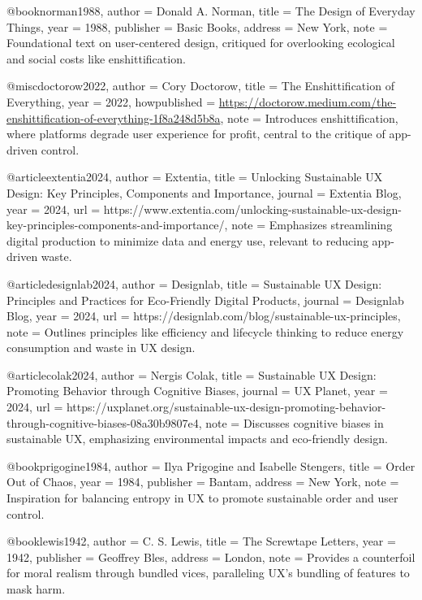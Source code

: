 @book{norman1988,
  author    = {Donald A. Norman},
  title     = {The Design of Everyday Things},
  year      = {1988},
  publisher = {Basic Books},
  address   = {New York},
  note      = {Foundational text on user-centered design, critiqued for overlooking ecological and social costs like enshittification.}
}

@misc{doctorow2022,
  author    = {Cory Doctorow},
  title     = {The Enshittification of Everything},
  year      = {2022},
  howpublished = {\url{https://doctorow.medium.com/the-enshittification-of-everything-1f8a248d5b8a}},
  note      = {Introduces enshittification, where platforms degrade user experience for profit, central to the critique of app-driven control.}
}

@article{extentia2024,
  author    = {{Extentia}},
  title     = {Unlocking Sustainable UX Design: Key Principles, Components and Importance},
  journal   = {Extentia Blog},
  year      = {2024},
  url       = {https://www.extentia.com/unlocking-sustainable-ux-design-key-principles-components-and-importance/},
  note      = {Emphasizes streamlining digital production to minimize data and energy use, relevant to reducing app-driven waste.}
}

@article{designlab2024,
  author    = {{Designlab}},
  title     = {Sustainable UX Design: Principles and Practices for Eco-Friendly Digital Products},
  journal   = {Designlab Blog},
  year      = {2024},
  url       = {https://designlab.com/blog/sustainable-ux-principles},
  note      = {Outlines principles like efficiency and lifecycle thinking to reduce energy consumption and waste in UX design.}
}

@article{colak2024,
  author    = {Nergis Colak},
  title     = {Sustainable UX Design: Promoting Behavior through Cognitive Biases},
  journal   = {UX Planet},
  year      = {2024},
  url       = {https://uxplanet.org/sustainable-ux-design-promoting-behavior-through-cognitive-biases-08a30b9807e4},
  note      = {Discusses cognitive biases in sustainable UX, emphasizing environmental impacts and eco-friendly design.}
}

@book{prigogine1984,
  author    = {Ilya Prigogine and Isabelle Stengers},
  title     = {Order Out of Chaos},
  year      = {1984},
  publisher = {Bantam},
  address   = {New York},
  note      = {Inspiration for balancing entropy in UX to promote sustainable order and user control.}
}

@book{lewis1942,
  author    = {C. S. Lewis},
  title     = {The Screwtape Letters},
  year      = {1942},
  publisher = {Geoffrey Bles},
  address   = {London},
  note      = {Provides a counterfoil for moral realism through bundled vices, paralleling UX's bundling of features to mask harm.}
}

